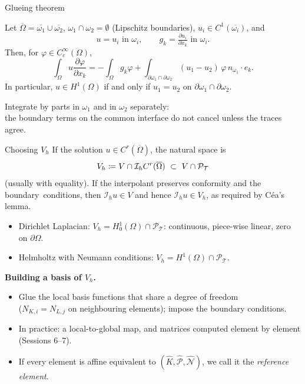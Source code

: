 \begin{frame}{Glueing theorem}
    \small
    \begin{theorem}[Glueing]
        Let $\overline\Omega = \overline{\omega_1} \cup \overline{\omega_2}$, $\omega_1 \cap \omega_2 = \emptyset$ (Lipschitz boundaries), $u_i \in C^1(\overline{\omega_i})$, and
        \[
            u = u_i \text{ in } \omega_i, \qquad g_k = \tfrac{\partial u_i}{\partial x_k} \text{ in } \omega_i.
        \]
        Then, for $\varphi \in C^\infty_c(\Omega)$,
        \[
            \int_\Omega u \frac{\partial \varphi}{\partial x_k} = -\int_\Omega g_k \varphi + \int_{\partial\omega_1 \cap \partial\omega_2} (u_1 - u_2)\, \varphi\, n_{\omega_1}\cdot e_k .
        \]
        In particular, $u \in H^1(\Omega)$ if and only if $u_1 = u_2$ on $\partial\omega_1 \cap \partial\omega_2$.
    \end{theorem}
    \begin{proofsteps}[Idea]
        Integrate by parts in $\omega_1$ and in $\omega_2$ separately:\\ the boundary terms on the common interface do not cancel unless the traces agree.
    \end{proofsteps}
\end{frame}

\begin{frame}{Choosing $V_h$}
    If the solution $u \in C^r(\overline \Omega)$, the natural space is
    \[
        V_h \coloneqq V \cap \mathcal I_h C^r(\overline\Omega) \ \subset\ V \cap \mathcal P_{\mathcal T}
    \]
    (usually with equality). If the interpolant preserves conformity and the boundary~conditions, then $\mathcal I_h u\in V$ and hence $\mathcal I_h u\in V_h$, as required by Céa's lemma.
    \begin{example}
        \begin{itemize}
            \item Dirichlet Laplacian: $V_h = H^1_0(\Omega) \cap \mathcal P_{\mathcal T}$: continuous, piece-wise linear, zero on $\partial\Omega$.
            \item Helmholtz with Neumann conditions: $V_h = H^1(\Omega) \cap \mathcal P_{\mathcal T}$.
        \end{itemize}
    \end{example}
    \textbf{Building a basis of $V_h$.}
    \begin{itemize}
        \item Glue the local basis functions that share a degree of freedom\\ ($N_{K,i} = N_{L,j}$ on neighbouring elements); impose the boundary conditions.
        \item In practice: a \alert{local-to-global} map, and matrices computed element by element (Sessions 6--7).
        \item If every element is affine equivalent to $(\widehat K, \widehat{\mathcal P}, \widehat{\mathcal N})$, we call it the \emph{reference element}.
    \end{itemize}
\end{frame}

